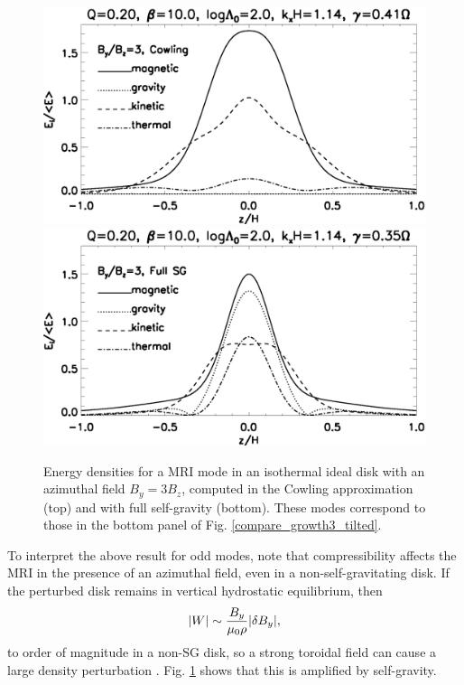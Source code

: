 \begin{figure}
  \includegraphics[width=\linewidth,clip=true,trim=0cm 1.5cm 0cm
    0cm]{figures/result_tilted_cowling.ps}  
  \includegraphics[width=\linewidth,clip=true,trim=0cm 0cm 0cm
    0.cm]{figures/result_tilted_fullsg.ps} 
  \caption{Energy densities for a MRI mode in an isothermal ideal disk
    with an azimuthal field $B_y = 3B_z$, computed in the Cowling
    approximation (top) and with full self-gravity (bottom). These
    modes correspond to those in the bottom panel of
    Fig. \ref{compare_growth3_tilted}.    
    \label{result_tilted}}
\end{figure}

To interpret the above result for odd modes, note 
that compressibility affects the MRI in the presence of an 
azimuthal field, even in a non-self-gravitating disk. If the perturbed 
disk remains in vertical hydrostatic equilibrium, then 
\begin{align} 
  |W|\sim \frac{B_y}{\mu_0\rho}|\delta B_y|,
\end{align}
to order of magnitude in a non-SG disk, so a strong toroidal field can
cause a large density perturbation
\citep{pessah05}. Fig. \ref{result_tilted} shows that this is
amplified by self-gravity.  

